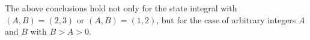\documentclass[12pt,reqno]{amsart}
\theoremstyle{definition}
\newcommand{\red}[1]{{\color{red} #1}}
\def\BC{\mathbbm C}
\def\ve{\varepsilon}
\def\sss#1{$\clubsuit\clubsuit$ \textcolor[rgb]{0.0,0.5,0.0}
  {SG: \emph{#1}}$\clubsuit\clubsuit$}
\def\ms{\mathsf}
\def\jjj#1{$\spadesuit\spadesuit$ \textcolor{red}{JG: \emph{#1}}
  $\spadesuit\spadesuit$}
\begin{document}
%  



  The above conclusions hold not only for the state integral with
  $(A,B)=(2,3)$ or $(A,B)=(1,2)$, but for the case of arbitrary
  integers $A$ and $B$ with $B > A > 0$.
  


%

\end{document}
